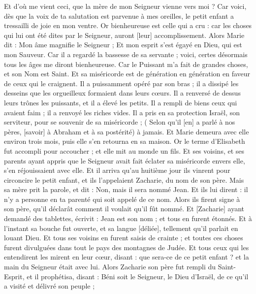 \begin{multicols}{2}
Et d'où me vient ceci, que la mère de mon Seigneur vienne vers moi ?
Car voici, dès que la voix de ta salutation est parvenue à mes oreilles, le petit enfant a tressailli de joie en mon ventre.
Or bienheureuse est celle qui a cru : car les choses qui lui ont été dites par le Seigneur, auront [leur] accomplissement.
Alors Marie dit : Mon âme magnifie le Seigneur ;
Et mon esprit s'est égayé en Dieu, qui est mon Sauveur.
Car il a regardé la bassesse de sa servante ; voici, certes désormais tous les âges me diront bienheureuse.
Car le Puissant m'a fait de grandes choses, et son Nom est Saint.
Et sa miséricorde est de génération en génération en faveur de ceux qui le craignent.
Il a puissamment opéré par son bras ; il a dissipé les desseins que les orgueilleux formaient dans leurs cœurs.
Il a renversé de dessus leurs trônes les puissants, et il a élevé les petits.
Il a rempli de biens ceux qui avaient faim ; il a renvoyé les riches vides.
Il a pris en sa protection Israël, son serviteur, pour se souvenir de sa miséricorde ;
( Selon qu'il [en] a parlé à nos pères, [savoir] à Abraham et à sa postérité) à jamais.
Et Marie demeura avec elle environ trois mois, puis elle s'en retourna en sa maison.
Or le terme d'Elisabeth fut accompli pour accoucher ; et elle mit au monde un fils.
Et ses voisins, et ses parents ayant appris que le Seigneur avait fait éclater sa miséricorde envers elle, s'en réjouissaient avec elle.
Et il arriva qu'au huitième jour ils vinrent pour circoncire le petit enfant, et ils l'appelaient Zacharie, du nom de son père.
Mais sa mère prit la parole, et dit : Non, mais il sera nommé Jean.
Et ils lui dirent : il n'y a personne en ta parenté qui soit appelé de ce nom.
Alors ils firent signe à son père, qu'il déclarât comment il voulait qu'il fût nommé.
Et [Zacharie] ayant demandé des tablettes, écrivit : Jean est son nom ; et tous en furent étonnés.
Et à l'instant sa bouche fut ouverte, et sa langue [déliée], tellement qu'il parlait en louant Dieu.
Et tous ses voisins en furent saisis de crainte ; et toutes ces choses furent divulguées dans tout le pays des montagnes de Judée.
Et tous ceux qui les entendirent les mirent en leur cœur, disant : que sera-ce de ce petit enfant ? et la main du Seigneur était avec lui.
Alors Zacharie son père fut rempli du Saint-Esprit, et il prophétisa, disant :
Béni soit le Seigneur, le Dieu d'Israël, de ce qu'il a visité et délivré son peuple ;

\end{multicols}
